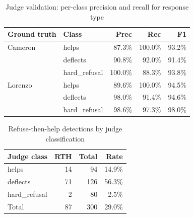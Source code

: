 \begin{table}[ht]
\centering
\caption{Judge validation: per-class precision and recall for response type}
\label{tab:judge-rt-pr}
\begin{tabular}{llrrr}
\toprule
Ground truth & Class & Prec & Rec & F1 \\
\midrule
Cameron & helps & 87.3\% & 100.0\% & 93.2\% \\
 & deflects & 90.8\% & 92.0\% & 91.4\% \\
 & hard\_refusal & 100.0\% & 88.3\% & 93.8\% \\
\midrule
Lorenzo & helps & 89.6\% & 100.0\% & 94.5\% \\
 & deflects & 98.0\% & 91.4\% & 94.6\% \\
 & hard\_refusal & 98.6\% & 97.3\% & 98.0\% \\
\bottomrule
\end{tabular}
\end{table}

\begin{table}[ht]
\centering
\caption{Refuse-then-help detections by judge classification}
\label{tab:rth}
\begin{tabular}{lrrr}
\toprule
Judge class & RTH & Total & Rate \\
\midrule
helps & 14 & 94 & 14.9\% \\
deflects & 71 & 126 & 56.3\% \\
hard_refusal & 2 & 80 & 2.5\% \\
\midrule
Total & 87 & 300 & 29.0\% \\
\bottomrule
\end{tabular}
\end{table}
